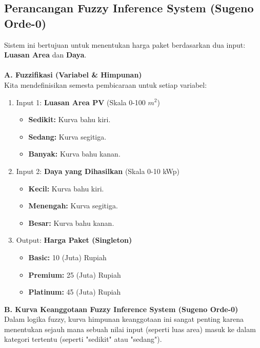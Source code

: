 \documentclass{article}
\begin{document}
\subsection*{Perancangan Fuzzy Inference System (Sugeno Orde-0)}
Sistem ini bertujuan untuk menentukan harga paket berdasarkan dua input: \textbf{Luasan Area} dan \textbf{Daya}.
\\
\\
\textbf{A. Fuzzifikasi (Variabel \& Himpunan)}\\
Kita mendefinisikan semesta pembicaraan untuk setiap variabel:
\begin{enumerate}
    \item Input 1: \textbf{Luasan Area PV} (Skala 0-100 $m^2$)
    \begin{itemize}
        \item \textbf{Sedikit:} Kurva bahu kiri.
        \item \textbf{Sedang:} Kurva segitiga.
        \item \textbf{Banyak:} Kurva bahu kanan.
    \end{itemize}

    \item Input 2: \textbf{Daya yang Dihasilkan} (Skala 0-10 kWp)
    \begin{itemize}
        \item \textbf{Kecil:} Kurva bahu kiri.
        \item \textbf{Menengah:} Kurva segitiga.
        \item \textbf{Besar:} Kurva bahu kanan.
    \end{itemize}

    \item Output: \textbf{Harga Paket (Singleton)}
    \begin{itemize}
        \item \textbf{Basic:} 10 (Juta) Rupiah
        \item \textbf{Premium:} 25 (Juta) Rupiah
        \item \textbf{Platinum:} 45 (Juta) Rupiah
    \end{itemize}
\end{enumerate}

\textbf{B. Kurva Keanggotaan Fuzzy Inference System (Sugeno Orde-0)}\\
Dalam logika fuzzy, kurva himpunan keanggotaan ini sangat penting karena menentukan sejauh mana sebuah nilai input (seperti luas area) masuk ke dalam kategori tertentu (seperti "sedikit" atau "sedang"). \\
\end{document}
